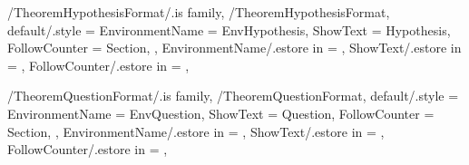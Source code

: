 \newcommand{\InitTheoremConjectureFormat}
{%
  \theoremstyle{plain}%
  \ifthenelse{\equal{\GetTheoremConjectureFormatFollowCounter}{\empty}}%
  {%
    \newtheorem{%
      \GetTheoremConjectureFormatEnvironmentName}{%
      \GetTheoremConjectureFormatShowText}%
  }%
  {%
    \MappingTheoremCounter[Conjecture]{\GetTheoremConjectureFormatFollowCounter}%
    \newtheorem{%
      \GetTheoremConjectureFormatEnvironmentName}{%
      \GetTheoremConjectureFormatShowText}[%
      \GetTheoremConjectureFormatFollowCounter]%
  }%
} %


\pgfkeys
{
  /TheoremHypothesisFormat/.is family, /TheoremHypothesisFormat,
  default/.style =
  {
    EnvironmentName = {EnvHypothesis},
    ShowText = {Hypothesis},
    FollowCounter = Section,
  },
  EnvironmentName/.estore in = \GetTheoremHypothesisFormatEnvironmentName,
  ShowText/.estore in = \GetTheoremHypothesisFormatShowText,
  FollowCounter/.estore in = \GetTheoremHypothesisFormatFollowCounter,
} %

\newcommand{\InsertHypothesis}[2][\empty]
{%
  \InsertTheoremContent[#1]{\GetTheoremHypothesisFormatEnvironmentName}{#2}%
} %

\newcommand{\InitTheoremHypothesisFormat}
{%
  \theoremstyle{definition}%
  \ifthenelse{\equal{\GetTheoremHypothesisFormatFollowCounter}{\empty}}%
  {%
    \newtheorem{%
      \GetTheoremHypothesisFormatEnvironmentName}{%
      \GetTheoremHypothesisFormatShowText}%
  }%
  {%
    \MappingTheoremCounter[Hypothesis]{\GetTheoremHypothesisFormatFollowCounter}%
    \newtheorem{%
      \GetTheoremHypothesisFormatEnvironmentName}{%
      \GetTheoremHypothesisFormatShowText}[%
      \GetTheoremHypothesisFormatFollowCounter]%
  }%
} %


\pgfkeys
{
  /TheoremQuestionFormat/.is family, /TheoremQuestionFormat,
  default/.style =
  {
    EnvironmentName = {EnvQuestion},
    ShowText = {Question},
    FollowCounter = Section,
  },
  EnvironmentName/.estore in = \GetTheoremQuestionFormatEnvironmentName,
  ShowText/.estore in = \GetTheoremQuestionFormatShowText,
  FollowCounter/.estore in = \GetTheoremQuestionFormatFollowCounter,
} %

\newcommand{\InsertQuestion}[2][\empty]
{%
  \InsertTheoremContent[#1]{\GetTheoremQuestionFormatEnvironmentName}{#2}%
} %

